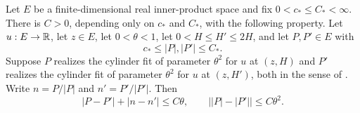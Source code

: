 \begin{lemma}
Let $E$ be a finite-dimensional real inner-product space and fix
$0<c_*\le C_*<\infty$. There is $C>0$, depending only on $c_*$ and $C_*$, with
the following property. Let $u:E\to\mathbb{R}$, let $z\in E$, let $0<\theta<1$, let
$0<H\le H'\le2H$, and let $P,P'\in E$ with
\[
  c_*\le|P|,|P'|\le C_* .
\]
Suppose $P$ realizes the cylinder fit of parameter $\theta^2$ for $u$ at
$(z,H)$ and $P'$ realizes the cylinder fit of parameter $\theta^2$ for $u$ at
$(z,H')$, both in the sense of . Write $n=P/|P|$ and
$n'=P'/|P'|$. Then
\begin{equation}\label{eq:cylinder-comparison}
  |P-P'|+|n-n'|\le C\theta,\qquad
  \bigl||P|-|P'|\bigr|\le C\theta^2 .
\end{equation}
\end{lemma}
